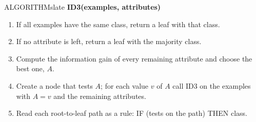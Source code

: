 \documentclass[11pt,a4paper]{article}
\newenvironment{algorithm}{\begin{secbox}{ALGORITHM}{slate}}{\end{secbox}}
\begin{document}
\begin{algorithm}
\textbf{ID3(examples, attributes)}
\begin{enumerate}
  \item If all examples have the same class, return a leaf with that class.
  \item If no attribute is left, return a leaf with the majority class.
  \item Compute the information gain of every remaining attribute and choose the best one, $A$.
  \item Create a node that tests $A$; for each value $v$ of $A$ call ID3 on the examples with $A=v$ and the remaining attributes.
  \item Read each root-to-leaf path as a rule: IF (tests on the path) THEN class.
\end{enumerate}
\end{algorithm}
\end{document}

